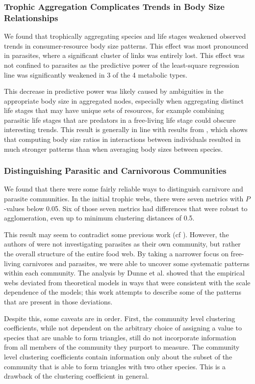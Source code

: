 \documentclass[../dissertation.tex]{subfiles}
\begin{document}
\subsubsection{Trophic Aggregation Complicates Trends in Body Size
Relationships} We found that trophically aggregating species and life stages
weakened observed trends in consumer-resource body size patterns. This effect
was most pronounced in parasites, where a significant cluster of links was
entirely lost. This effect was not confined to parasites as the predictive
power of the least-square regression line was significantly weakened in 3 of
the 4 metabolic types. 

This decrease in predictive power was likely caused by ambiguities in the
appropriate body size in aggregated nodes, especially when aggregating distinct
life stages that may have unique sets of resources, for example combining
parasitic life stages that are predators in a free-living life stage could
obscure interesting trends. This result is generally in line with results from
\cite{Gilljam2012}, which shows that computing body size ratios in interactions
between individuals resulted in much stronger patterns than when averaging body
sizes between species. 

\subsubsection{Distinguishing Parasitic and Carnivorous Communities} We found
that there were some fairly reliable ways to distinguish carnivore and parasite
communities. In the initial trophic webs, there were seven metrics with
$P$-values below 0.05. Six of those seven metrics had differences that were
robust to agglomeration, even up to minimum clustering distances of 0.5.

This result may seem to contradict some previous work (cf \cite{Dunne2013}).
However, the authors of \cite{Dunne2013} were not investigating parasites as
their own community, but rather the overall structure of the entire food web.
By taking a narrower focus on free-living carnivores and parasites, we were
able to uncover some systematic patterns within each community. The analysis by
Dunne et al. showed that the empirical webs deviated from theoretical
models in ways that were consistent with the scale dependence of the models;
this work attempts to describe some of the patterns that are present in those
deviations. 

Despite this, some caveats are in order. First, the community level clustering
coefficients, while not dependent on the arbitrary choice of assigning a value
to species that are unable to form triangles, still do not incorporate
information from all members of the community they purport to measure. The
community level clustering coefficients contain information only about the
subset of the community that is able to form triangles with two other species.
This is a drawback of the clustering coefficient in general. 
\end{document}
